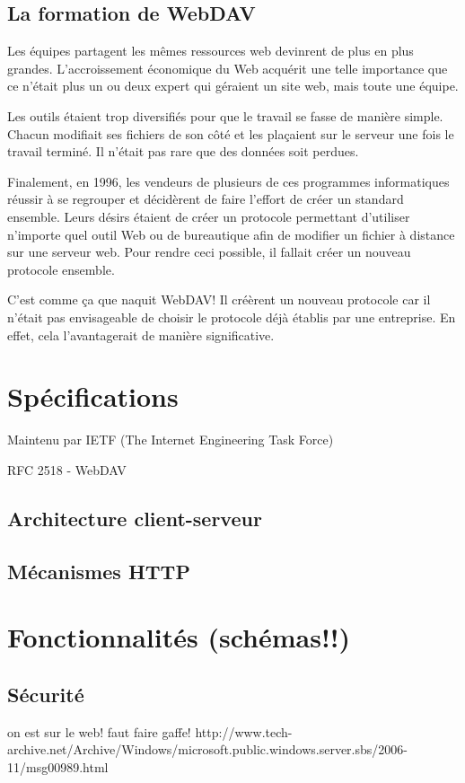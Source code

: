 \documentclass[a4paper, 11pt]{article}
\begin{document}
	\subsection{La formation de WebDAV}
	
		Les équipes partagent les mêmes ressources web devinrent de plus en plus grandes. L'accroissement économique du Web acquérit une telle importance que ce n'était plus un ou deux expert qui géraient un site web, mais toute une équipe.
		
		Les outils étaient trop diversifiés pour que le travail se fasse de manière simple. Chacun modifiait ses fichiers de son côté et les plaçaient sur le serveur une fois le travail terminé. Il n'était pas rare que des données soit perdues.
		
		Finalement, en 1996, les vendeurs de plusieurs de ces programmes informatiques réussir à se regrouper et décidèrent de faire l'effort de créer un standard ensemble. Leurs désirs étaient de créer un protocole permettant d'utiliser n'importe quel outil Web ou de bureautique afin de modifier un fichier à distance sur une serveur web. Pour rendre ceci possible, il fallait créer un nouveau protocole ensemble.
		
		C'est comme ça que naquit WebDAV! Il créèrent un nouveau protocole car il n'était pas envisageable de choisir le protocole déjà établis par une entreprise. En effet, cela l'avantagerait de manière significative.  
		
\section{Spécifications}

	

	Maintenu par IETF (The Internet Engineering Task Force)

	RFC 2518 - WebDAV 
	\subsection{Architecture client-serveur}
	
	\subsection{Mécanismes HTTP}
	
\section{Fonctionnalités (schémas!!)}
	\subsection{Sécurité}
		on est sur le web! faut faire gaffe!
		http://www.tech-archive.net/Archive/Windows/microsoft.public.windows.server.sbs/2006-11/msg00989.html
\end{document}
